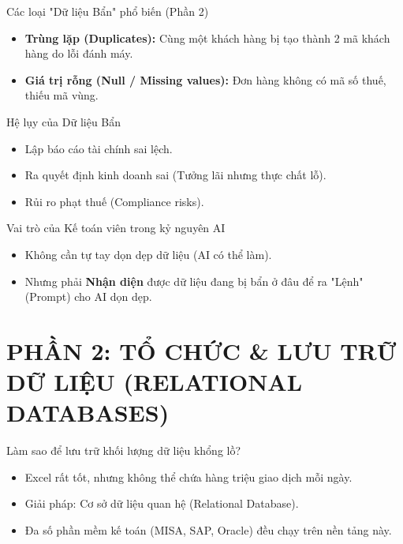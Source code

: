 \documentclass[aspectratio=169]{beamer}
\begin{document}
\begin{frame}{Các loại "Dữ liệu Bẩn" phổ biến (Phần 2)}
    \begin{itemize}
        \item \textbf{Trùng lặp (Duplicates):} Cùng một khách hàng bị tạo thành 2 mã khách hàng do lỗi đánh máy.
        \item \textbf{Giá trị rỗng (Null / Missing values):} Đơn hàng không có mã số thuế, thiếu mã vùng.
    \end{itemize}
\end{frame}


\begin{frame}{Hệ lụy của Dữ liệu Bẩn}
    \begin{itemize}
        \item Lập báo cáo tài chính sai lệch.
        \item Ra quyết định kinh doanh sai (Tưởng lãi nhưng thực chất lỗ).
        \item Rủi ro phạt thuế (Compliance risks).
    \end{itemize}
\end{frame}


\begin{frame}{Vai trò của Kế toán viên trong kỷ nguyên AI}
    \begin{itemize}
        \item Không cần tự tay dọn dẹp dữ liệu (AI có thể làm).
        \item Nhưng phải \textbf{Nhận diện} được dữ liệu đang bị bẩn ở đâu để ra "Lệnh" (Prompt) cho AI dọn dẹp.
    \end{itemize}
\end{frame}


\section{PHẦN 2: TỔ CHỨC \& LƯU TRỮ DỮ LIỆU (RELATIONAL DATABASES)}


\begin{frame}{Làm sao để lưu trữ khối lượng dữ liệu khổng lồ?}
    \begin{itemize}
        \item Excel rất tốt, nhưng không thể chứa hàng triệu giao dịch mỗi ngày.
        \item Giải pháp: Cơ sở dữ liệu quan hệ (Relational Database).
        \item Đa số phần mềm kế toán (MISA, SAP, Oracle) đều chạy trên nền tảng này.
    \end{itemize}
\end{frame}
\end{document}
